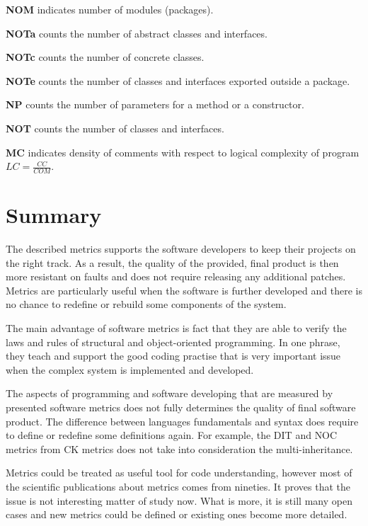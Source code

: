 \textbf{\ac{NOM}} indicates number of modules (packages).

\textbf{\ac{NOTa}} counts the number of abstract classes and interfaces.

\textbf{\ac{NOTc}} counts the number of concrete classes.	

\textbf{\ac{NOTe}} counts the number of classes and interfaces exported outside a package.

\textbf{\ac{NP}} counts the number of parameters for a method or a constructor.

\textbf{\ac{NOT}} counts the number of classes and interfaces.

\textbf{\ac{MC}} indicates density of comments with respect to logical complexity of program $LC=\frac { CC }{ COM } $.

\section{Summary}
The described metrics supports the software developers to keep their projects on the right track. As a result, the quality of the provided, final product is then more resistant on faults and does not require releasing any additional patches. Metrics are particularly useful when the software is further developed and there is no chance to redefine or rebuild some components of the system.

The main advantage of software metrics is fact that they are able to verify the laws and rules of structural and object-oriented programming. In one phrase, they teach and support the good coding practise that is very important issue when the complex system is implemented and developed.

The aspects of programming and software developing that are measured by presented software metrics does not fully determines the quality of final software product. The difference between languages fundamentals and syntax does require to define or redefine some definitions again. For example, the \ac{DIT} and \ac{NOC} metrics from \ac{CK metrics} does not take into consideration the multi-inheritance.   

Metrics could be treated as useful tool for code understanding, however most of the scientific publications about metrics comes from nineties. It proves that the issue is not interesting matter of study now. What is more, it is still many open cases and new metrics could be defined or existing ones become more detailed.